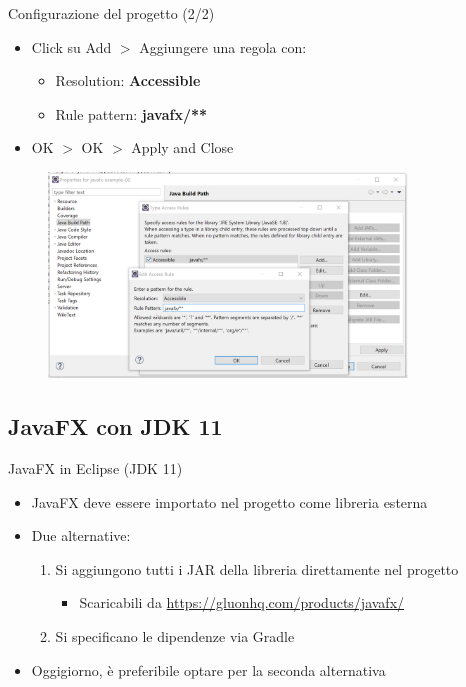 \documentclass[presentation]{beamer}
\begin{document}
\begin{frame}{Configurazione del progetto (2/2)}
\begin{itemize}
\item Click su Add $>$ Aggiungere una regola con:
\begin{itemize}
\item Resolution: \textbf{Accessible}
\item Rule pattern: \textbf{javafx/**}
\end{itemize}
\item OK $>$ OK $>$ Apply and Close 
\end{itemize}
\begin{figure}
\includegraphics[width=0.85\textwidth]{img/conf02.png}
\end{figure}
\end{frame}

\subsection{JavaFX con JDK 11}

\begin{frame}{JavaFX in Eclipse (JDK 11)}
\begin{itemize}\itemsep20pt
\item JavaFX deve essere importato nel progetto come libreria esterna
\item Due alternative:
\begin{enumerate}
\item Si aggiungono tutti i JAR della libreria direttamente nel progetto
\begin{itemize}
\item Scaricabili da \url{https://gluonhq.com/products/javafx/}
\end{itemize}
\item Si specificano le dipendenze via Gradle
\end{enumerate}
\item Oggigiorno, è preferibile optare per la seconda alternativa
\end{itemize}
\end{frame}
\end{document}
